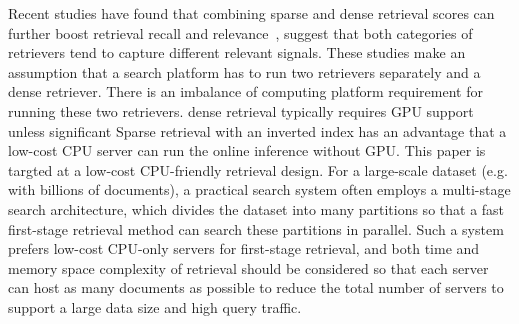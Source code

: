 Recent studies have found that combining  sparse and dense retrieval scores  can further boost
retrieval recall and relevance~\cite{Lin2021unicoil,2022LinearInterpolationJimLin,kuzi2020leveraging},
suggest  that both categories  of retrievers tend to capture  different relevant signals. 
These studies  make an assumption that  a search platform has to run two retrievers separately and a dense retriever.
There is an imbalance of computing platform requirement for running  these two retrievers.
dense retrieval typically requires GPU support unless significant  
Sparse retrieval with an inverted index has an advantage that a low-cost CPU server can run the online inference  without GPU.
This paper is targted at a low-cost CPU-friendly retrieval design.
For a large-scale  dataset (e.g. with billions of documents), a practical search system often employs  a multi-stage 
search architecture, which divides the dataset into many partitions so that  a fast first-stage  retrieval 
method  can  search these partitions in parallel.  Such a system  prefers low-cost
CPU-only servers for first-stage retrieval, and both time and memory space complexity of retrieval should be considered 
so that  each server can host as many documents as possible
to reduce the total number of servers to support a large data size and high query traffic. 


